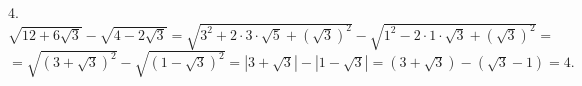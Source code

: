 4. $\sqrt{12+6\sqrt{3}}-\sqrt{4-2\sqrt{3}}=\sqrt{3^2+2\cdot3\cdot\sqrt{5}+(\sqrt{3})^2}-\sqrt{1^2-2\cdot1\cdot\sqrt{3}+(\sqrt{3})^2}=$\\$=
\sqrt{(3+\sqrt{3})^2}-\sqrt{(1-\sqrt{3})^2}=|3+\sqrt{3}|-|1-\sqrt{3}|=(3+\sqrt{3})-(\sqrt{3}-1)=4.$\\
